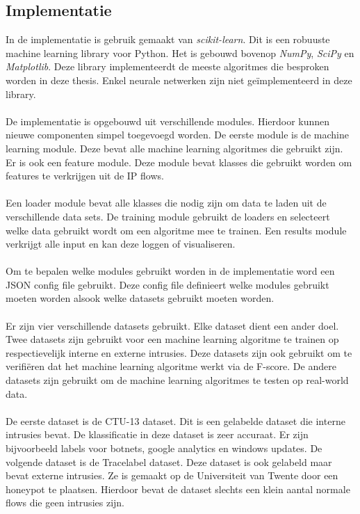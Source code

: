 \begin{samenvatting}
\section{Implementatie}
In de implementatie is gebruik gemaakt van \textit{scikit-learn}. Dit is een robuuste  machine learning library voor Python. Het is gebouwd bovenop \textit{NumPy}, \textit{SciPy} en \textit{Matplotlib}. Deze library implementeerdt de meeste algoritmes die besproken worden in deze thesis. Enkel neurale netwerken zijn niet ge\"implementeerd in deze library. \\
\\
De implementatie is opgebouwd uit verschillende modules. Hierdoor kunnen nieuwe componenten simpel toegevoegd worden. De eerste module is de machine learning module. Deze bevat alle machine learning algoritmes die gebruikt zijn. Er is ook een feature module. Deze module bevat klasses die gebruikt worden om features te verkrijgen uit de IP flows. \\
\\
Een loader module bevat alle klasses die nodig zijn om data te laden uit de verschillende data sets. De training module gebruikt de loaders en selecteert welke data gebruikt wordt om een algoritme mee te trainen. Een results module verkrijgt alle input en kan deze loggen of visualiseren.\\
\\
Om te bepalen welke modules gebruikt worden in de implementatie word een JSON config file gebruikt. Deze config file definieert welke modules gebruikt moeten worden alsook welke datasets gebruikt moeten worden. \\
\\
Er zijn vier verschillende datasets gebruikt. Elke dataset dient een ander doel. Twee datasets zijn gebruikt voor een machine learning algoritme te trainen op respectievelijk interne en externe intrusies. Deze datasets zijn ook gebruikt om te verifi\"eren dat het machine learning algoritme werkt via de F-score. De andere datasets zijn gebruikt om de machine learning algoritmes te testen op real-world data. \\
\\
De eerste dataset is de CTU-13 dataset. Dit is een gelabelde dataset die interne intrusies bevat. De klassificatie in deze dataset is zeer accuraat. Er zijn bijvoorbeeld labels voor botnets, google analytics en windows updates. De volgende dataset is de Tracelabel dataset. Deze dataset is ook gelabeld maar bevat externe intrusies. Ze is gemaakt op de Universiteit van Twente door een honeypot te plaatsen. Hierdoor bevat de dataset slechts een klein aantal normale flows die geen intrusies zijn.\\

\end{samenvatting}
